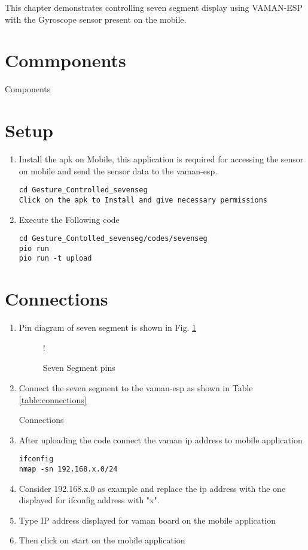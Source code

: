This chapter demonstrates controlling seven segment display using VAMAN-ESP with the Gyroscope sensor present on the mobile. 

\section{Commponents}
\begin{table}[!ht]
	    \centering
	    
	    \caption{Components}
	\end{table}
\section{Setup}
\begin{enumerate}
    \item Install the apk on Mobile, this application is required for accessing the sensor on mobile and send the sensor data to the vaman-esp.
\begin{lstlisting}
cd Gesture_Controlled_sevenseg
Click on the apk to Install and give necessary permissions
\end{lstlisting}
    \item Execute the Following code
\begin{lstlisting}
cd Gesture_Contolled_sevenseg/codes/sevenseg
pio run
pio run -t upload
\end{lstlisting}
\end{enumerate}
\section{Connections}
\begin{enumerate}
    \item Pin diagram of seven segment is shown in Fig. \ref{fig:sevenseg}
    	\begin{figure}[!ht]
		\begin{center}
		\resizebox {0.5\columnwidth} {!} {
		}
		\end{center}
		\caption{Seven Segment pins}
		\label{fig:sevenseg}
	\end{figure}
    \item Connect the seven segment to the vaman-esp as shown in Table \ref{table:connections}
    	\begin{table}[!ht]
	    \centering
	    
	    \caption{Connections}
	    \label{table:connections}
	\end{table}
    \item After uploading the code connect the vaman ip address to mobile application
\begin{lstlisting}
ifconfig
nmap -sn 192.168.x.0/24
\end{lstlisting}
    \item Consider 192.168.x.0 as example and replace the ip address with the one displayed for ifconfig address with "x".
    \item Type IP address displayed for vaman board on the mobile application
    \item Then click on start on the mobile application
\end{enumerate}
